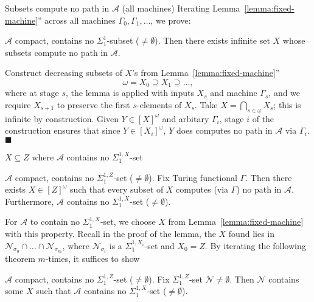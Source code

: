 \begin{frame}{Subsets compute no path in $\mathcal{A}$ (all machines)}
  Iterating Lemma~\ref{lemma:fixed-machine}'' across all machines
  $\Gamma_0,\Gamma_1,\ldots$, we prove:
  \begin{main-thm*}
    $\mathcal{A}$ compact, contains no $\Sigma_1^1$-subset
    ($\neq\emptyset$). Then there exists infinite set $X$ whose subsets
    compute no path in $\mathcal{A}$.
  \end{main-thm*}

  Construct decreasing subsets of $X$'s from
  Lemma~\ref{lemma:fixed-machine}''
  \[\omega= X_0\supseteq X_1\supseteq\ldots,\]
  where at stage $s$, the lemma is applied with inputs $X_s$ and machine
  $\Gamma_s$, and we require $X_{s+1}$ to preserve the first $s$-elements
  of $X_s$. Take $X=\bigcap_{s\in\omega}X_s$; this is infinite by
  construction. Given $Y\in[X]^\omega$ and arbitary $\Gamma_i$, stage $i$
  of the construction ensures that since $Y\in[X_i]^\omega$, $Y$ does
  computes no path in $\mathcal{A}$ via $\Gamma_i$. $\blacksquare$
\end{frame}

\begin{frame}{$X\subseteq Z$ where $\mathcal{A}$ contains no
$\Sigma_1^{1,X}$-set}
  \begin{lemma-strengthened1*}
    $\mathcal{A}$ compact, contains no $\Sigma_1^{1,Z}$-set
    ($\neq\emptyset$). Fix Turing functional $\Gamma$. Then
    there exists $X\in[Z]^\omega$ such that every subset of $X$ computes
    (via $\Gamma$) no path in $\mathcal{A}$. Furthermore, $\mathcal{A}$
    contains no $\Sigma_1^{1,X}$-set ($\neq\emptyset$).
  \end{lemma-strengthened1*}

  \vspace{0.5em}
  For $\mathcal{A}$ to contain no $\Sigma_1^{1,X}$-set, we choose $X$ from
  Lemma~\ref{lemma:fixed-machine} with this property. Recall
  in the proof of the lemma, the $X$ found lies in
  $\mathcal{N}_{\sigma_0}\cap \ldots\cap\mathcal{N}_{\sigma_m}$,
  where $\mathcal{N}_{\sigma_i}$ is a $\Sigma_1^{1,X_i}$-set and $X_0=Z$.
  By iterating the following theorem $m$-times, it suffices to show

  \vspace{0.5em}
  \begin{immunity*}[Relativized]
    $\mathcal{A}$ compact, contains no $\Sigma_1^{1,Z}$-set
    ($\neq\emptyset$). Fix $\Sigma_1^{1,Z}$-set
    $\mathcal{N}\neq\emptyset$. Then $\mathcal{N}$ contains some $X$ such
    that $\mathcal{A}$ contains no $\Sigma_1^{1,X}$-set ($\neq\emptyset$).
  \end{immunity*}
\end{frame}

